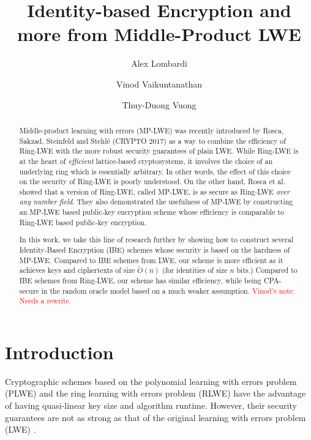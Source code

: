 \documentclass[11pt]{article}
\title{Identity-based Encryption and more from Middle-Product LWE}
\author{Alex Lombardi \and
Vinod Vaikuntanathan \and
Thuy-Duong Vuong
}
\date{}
\newcommand{\vnote}[1]{\textcolor{red}{Vinod's note: {#1}}}
\begin{document}
\maketitle
\begin{abstract}
Middle-product learning with errors (MP-LWE) was recently introduced by Rosca, Sakzad, Steinfeld and Stehl\'{e} (CRYPTO 2017) as a way to combine the efficiency of Ring-LWE with the more robust security guarantees of plain LWE. While Ring-LWE is at the heart of {\em efficient} lattice-based cryptosystems, it involves the choice of an underlying ring which is essentially arbitrary. In other words, the effect of this choice on the security of Ring-LWE is poorly understood. On the other hand, Rosca et al. showed that a version of Ring-LWE, called MP-LWE, is as secure as Ring-LWE {\em over any number field}. They also demonstrated the usefulness of MP-LWE by constructing an MP-LWE based public-key encryption scheme whose efficiency is comparable to Ring-LWE based public-key encryption.

In this work, we take this line of research further by showing how to construct several Identity-Based Encryption (IBE) schemes whose security is based on the hardness of MP-LWE. Compared to IBE schemes from LWE, our scheme is more efficient as it achieves keys and ciphertexts of size $\tilde{O}(n)$ (for identities of size $n$ bits.) Compared to IBE schemes from Ring-LWE, our scheme has similar efficiency, while being CPA-secure in the random oracle model based on a much weaker assumption. \vnote{Needs a rewrite.}

\end{abstract}
\newpage

\section{Introduction}
Cryptographic schemes based on the polynomial learning with errors problem (PLWE) \cite{10.1007/978-3-642-10366-7_36} and the ring learning with errors problem (RLWE) \cite{LPR10}  have the advantage of having quasi-linear key size and algorithm runtime. However, their security guarantees are not as strong as that of the original learning with errors problem (LWE) \cite{Reg05}. 
\end{document}

